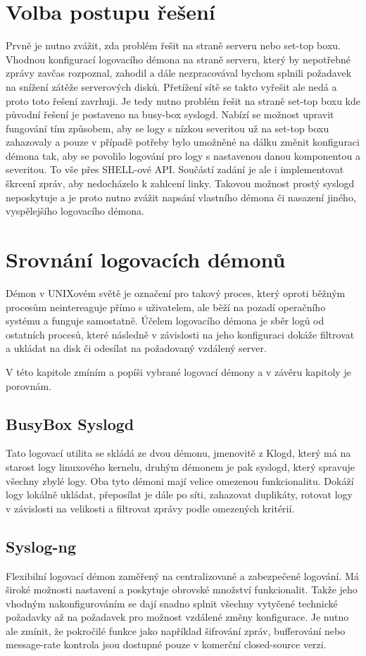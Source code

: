 \documentclass[thesis=B,czech]{FITthesis}[2012/06/26]
\begin{document}
\section{Volba postupu řešení}
Prvně je nutno zvážit, zda problém řešit na straně serveru nebo set-top boxu. Vhodnou konfigurací logovacího démona na straně serveru, který by nepotřebné zprávy zavčas rozpoznal, zahodil a dále nezpracovával bychom splnili požadavek na snížení zátěže serverových disků. Přetížení sítě se takto vyřešit ale nedá a proto toto řešení zavrhuji.
Je tedy nutno problém řešit na straně set-top boxu kde původní řešení je postaveno na busy-box syslogd. Nabízí se možnost upravit fungování tím způsobem, aby se logy s nízkou severitou už na set-top boxu zahazovaly a pouze v případě potřeby bylo umožněné na dálku změnit konfiguraci démona tak, aby se povolilo logování pro logy s nastavenou danou komponentou a severitou. To vše přes SHELL-ové API.
Součástí zadání je ale i implementovat škrcení zpráv, aby nedocházelo k zahlcení linky. Takovou možnost prostý syslogd neposkytuje a je proto nutno zvážit napsání vlastního démona či nasazení jiného, vyspělejšího logovacího démona.


\section{Srovnání logovacích démonů}
Démon v UNIXovém světě je označení pro takový proces, který oproti běžným procesům neintereaguje přímo s uživatelem, ale běží na pozadí operačního systému a funguje samostatně. Účelem logovacího démona je sběr logů od ostatních procesů, které následně v závislosti na jeho konfiguraci dokáže filtrovat a ukládat na disk či odesílat na požadovaný vzdálený server.

V této kapitole zmíním a popíši vybrané logovací démony a v závěru kapitoly je porovnám.

\subsection*{BusyBox Syslogd}
Tato logovací utilita se skládá ze dvou démonu, jmenovitě z Klogd, který má na starost logy linuxového kernelu, druhým démonem je pak syslogd, který spravuje všechny zbylé logy.
Oba tyto démoni mají velice omezenou funkcionalitu. Dokáží logy lokálně ukládat, přeposílat je dále po síti, zahazovat duplikáty, rotovat logy v závislosti na velikosti a filtrovat zprávy podle omezených kritérií.

\subsection*{Syslog-ng}
Flexibilní logovací démon zaměřený na centralizované a zabezpečené logování. Má široké možnosti nastavení a poskytuje obrovské množství funkcionalit. Takže jeho vhodným nakonfigurováním se dají snadno splnit všechny vytyčené technické požadavky až na požadavek pro možnost vzdálené změny konfigurace.
Je nutno ale zmínit, že pokročilé funkce jako například šifrování zpráv, bufferování nebo message-rate kontrola jsou dostupné pouze v komerční closed-source verzi.
\end{document}
